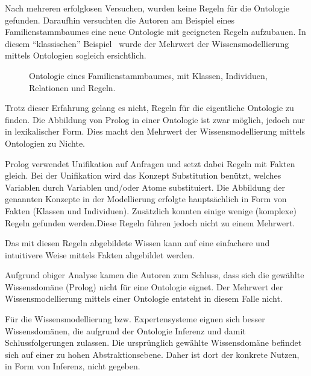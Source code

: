 Nach mehreren erfolglosen Versuchen, wurden keine Regeln für die Ontologie gefunden. Daraufhin versuchten die Autoren am Beispiel eines Familienstammbaumes eine neue Ontologie mit geeigneten Regeln aufzubauen. In diesem ``klassischen'' Beispiel~\cite[Seite 152]{laemmel} wurde der Mehrwert der Wissensmodellierung mittels Ontologien sogleich ersichtlich.

\begin{figure}[H]
\centering {}
\caption{Ontologie eines Familienstammbaumes, mit Klassen, Individuen, Relationen und Regeln.\label{fig:familien_netz}\protect\footnotemark}
\end{figure}

Trotz dieser Erfahrung gelang es nicht, Regeln für die eigentliche Ontologie zu finden. Die Abbildung von Prolog in einer Ontologie ist zwar möglich, jedoch nur in lexikalischer Form. Dies macht den Mehrwert der Wissensmodellierung mittels Ontologien zu Nichte.

Prolog verwendet Unifikation auf Anfragen und setzt dabei Regeln mit Fakten gleich. Bei der Unifikation wird das Konzept Substitution benützt, welches Variablen durch Variablen und/oder Atome substituiert. Die Abbildung der genannten Konzepte in der Modellierung erfolgte hauptsächlich in Form von Fakten (Klassen und Individuen). Zusätzlich konnten einige wenige (komplexe) Regeln gefunden werden.Diese Regeln führen jedoch nicht zu einem Mehrwert.

Das mit diesen Regeln abgebildete Wissen kann auf eine einfachere und intuitivere Weise mittels Fakten abgebildet werden.

Aufgrund obiger Analyse kamen die Autoren zum Schluss, dass sich die gewählte Wissensdomäne (Prolog) nicht für eine Ontologie eignet. Der Mehrwert der Wissensmodellierung mittels einer Ontologie entsteht in diesem Falle nicht.

Für die Wissensmodellierung bzw. Expertensysteme eignen sich besser Wissensdomänen, die aufgrund der Ontologie Inferenz und damit Schlussfolgerungen zulassen. Die ursprünglich gewählte Wissensdomäne befindet sich auf einer zu hohen Abstraktionsebene. Daher ist dort der konkrete Nutzen, in Form von Inferenz, nicht gegeben.

